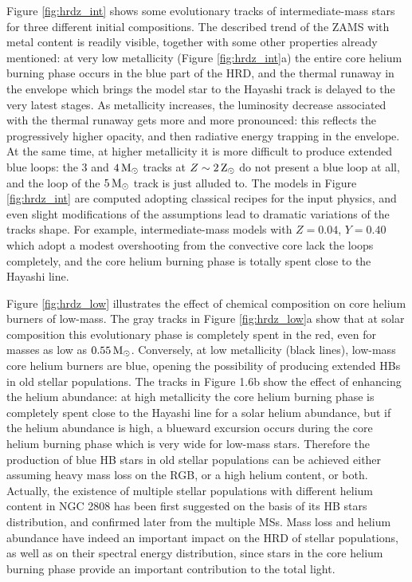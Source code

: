 \documentclass[a4paper,10pt]{article}
\begin{document}
{\noindent}Figure \ref{fig:hrdz_int} shows some evolutionary tracks of intermediate-mass stars for three different initial compositions. The described trend of the ZAMS with metal content is readily visible, together with some other properties already mentioned: at very low metallicity (Figure \ref{fig:hrdz_int}a) the entire core helium burning phase occurs in the blue part of the HRD, and the thermal runaway in the envelope which brings the model star to the Hayashi track is delayed to the very latest stages. As metallicity increases, the luminosity decrease associated with the thermal runaway gets more and more pronounced: this reflects the progressively higher opacity, and then radiative energy trapping in the envelope. At the same time, at higher metallicity it is more difficult to produce extended blue loops: the $3$ and $4\,{\rm M_\odot}$ tracks at $Z\sim2\,{\rm Z_\odot}$ do not present a blue loop at all, and the loop of the $5\,{\rm M_\odot}$ track is just alluded to. The models in Figure \ref{fig:hrdz_int} are computed adopting classical recipes for the input physics, and even slight modifications of the assumptions lead to dramatic variations of the tracks shape. For example, intermediate-mass models with $Z=0.04$, $Y=0.40$ which adopt a modest overshooting from the convective core lack the loops completely, and the core helium burning phase is totally spent close to the Hayashi line.

{\noindent}Figure \ref{fig:hrdz_low} illustrates the effect of chemical composition on core helium burners of low-mass. The gray tracks in Figure \ref{fig:hrdz_low}a show that at solar composition this evolutionary phase is completely spent in the red, even for masses as low as $0.55\,{\rm M_\odot}$. Conversely, at low metallicity (black lines), low-mass core helium burners are blue, opening the possibility of producing extended HBs in old stellar populations. The tracks in Figure 1.6b show the effect of enhancing the helium abundance: at high metallicity the core helium burning phase is completely spent close to the Hayashi line for a solar helium abundance, but if the helium abundance is high, a blueward excursion occurs during the core helium burning phase which is very wide for low-mass stars. Therefore the production of blue HB stars in old stellar populations can be achieved either assuming heavy mass loss on the RGB, or a high helium content, or both. Actually, the existence of multiple stellar populations with different helium content in NGC 2808 has been first suggested on the basis of its HB stars distribution, and confirmed later from the multiple MSs. Mass loss and helium abundance have indeed an important impact on the HRD of stellar populations, as well as on their spectral energy distribution, since stars in the core helium burning phase provide an important contribution to the total light.
\end{document}
